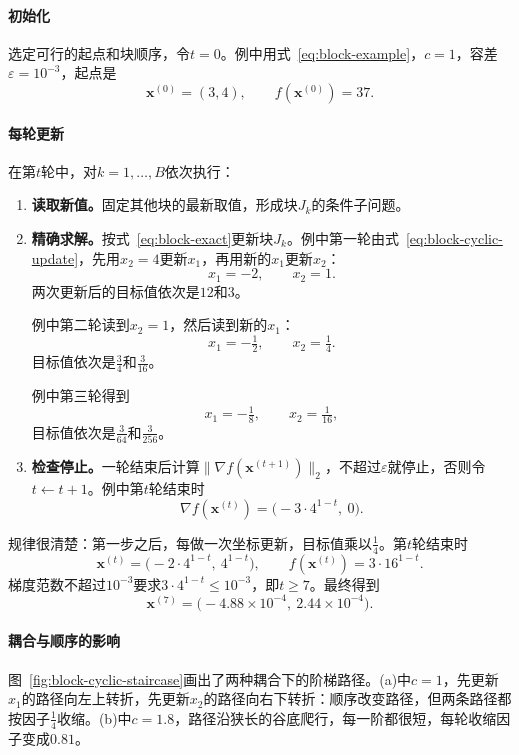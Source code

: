 \paragraph{初始化}
选定可行的起点和块顺序，令$t=0$。例中用式~\eqref{eq:block-example}，$c=1$，容差$\varepsilon=10^{-3}$，起点是
\[
 \bm{x}^{(0)}=(3,4),\qquad f(\bm{x}^{(0)})=37 .
\]

\paragraph{每轮更新}
在第$t$轮中，对$k=1,\ldots,B$依次执行：
\begin{enumerate}
 \item \textbf{读取新值。}固定其他块的最新取值，形成块$J_k$的条件子问题。
 \item \textbf{精确求解。}按式~\eqref{eq:block-exact}更新块$J_k$。例中第一轮由式~\eqref{eq:block-cyclic-update}，先用$x_2=4$更新$x_1$，再用新的$x_1$更新$x_2$：
 \[
  x_1=-2,\qquad x_2=1 .
 \]
 两次更新后的目标值依次是$12$和$3$。

 例中第二轮读到$x_2=1$，然后读到新的$x_1$：
 \[
  x_1=-\tfrac12,\qquad x_2=\tfrac14 .
 \]
 目标值依次是$\tfrac34$和$\tfrac{3}{16}$。

 例中第三轮得到
 \[
  x_1=-\tfrac18,\qquad x_2=\tfrac{1}{16},
 \]
 目标值依次是$\tfrac{3}{64}$和$\tfrac{3}{256}$。
 \item \textbf{检查停止。}一轮结束后计算$\lVert\nabla f(\bm{x}^{(t+1)})\rVert_2$，不超过$\varepsilon$就停止，否则令$t\leftarrow t+1$。例中第$t$轮结束时
 \[
  \nabla f(\bm{x}^{(t)})=\bigl(-3\cdot4^{1-t},\ 0\bigr).
 \]
\end{enumerate}

规律很清楚：第一步之后，每做一次坐标更新，目标值乘以$\tfrac14$。第$t$轮结束时
\[
 \bm{x}^{(t)}=\bigl(-2\cdot4^{1-t},\ 4^{1-t}\bigr),\qquad
 f(\bm{x}^{(t)})=3\cdot16^{1-t}.
\]
梯度范数不超过$10^{-3}$要求$3\cdot4^{1-t}\leq10^{-3}$，即$t\geq7$。最终得到
\[
 \bm{x}^{(7)}=\bigl(-4.88\times10^{-4},\ 2.44\times10^{-4}\bigr).
\]

\paragraph{耦合与顺序的影响}
图~\ref{fig:block-cyclic-staircase}画出了两种耦合下的阶梯路径。(a)中$c=1$，先更新$x_1$的路径向左上转折，先更新$x_2$的路径向右下转折：顺序改变路径，但两条路径都按因子$\tfrac14$收缩。(b)中$c=1.8$，路径沿狭长的谷底爬行，每一阶都很短，每轮收缩因子变成$0.81$。

